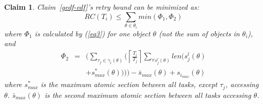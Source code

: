\documentclass[letter]{sig-alternate}
\newtheorem{clm}{Claim}
\begin{document}
\begin{clm}
Claim~\ref{gedf-edf}'s retry bound can be minimized as:
\begin{equation}
RC(T_{i})\le \sum_{\theta\in\theta_{i}}min(\Phi_1 , \Phi_2)\label{eq5}\end{equation}
where $\Phi_1$ is calculated by (\ref{eq3}) for one object $\theta$ (not the sum of objects in $\theta_i$),  and 
\begin{eqnarray}
\Phi_2 & = & \Bigg(\sum_{\tau_{j}\in\gamma_i(\theta)} \Big(\left\lceil\frac{T_{i}}{T_{j}}\right\rceil\sum_{\forall s_{j}^{l}(\theta)}len \big(s_{j}^{l}(\theta)\nonumber \\
 &  & +s_{max}^{*}(\theta) \big) \Big) \Bigg)-\bar{s}_{max}(\theta)+s_{i_{max}}(\theta)\label{eq4}\end{eqnarray}
 where $s^*_{max}$ is the maximum atomic section between all tasks, except $\tau_j$, accessing $\theta$. $\bar{s}_{max}(\theta)$ is the second maximum atomic section between all tasks accessing $\theta$.
\end{clm}
\end{document}
